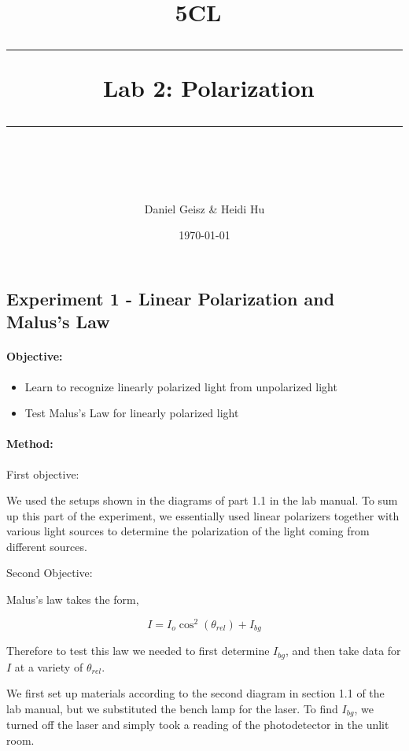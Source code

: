 \documentclass[11pt]{article}
\title{	
	\normalfont\normalsize
	\textsc{ 5CL}\ %
	\vspace{25pt} %
	\rule{\linewidth}{0.5pt}\ %
	\vspace{20pt} %
	{\huge Lab 2: Polarization}\ %
	\vspace{12pt} %
	\rule{\linewidth}{2pt}\ %
	\vspace{12pt} %
}
\author{\LARGE Daniel Geisz \& Heidi Hu} %
\date{\normalsize\today}
\providecommand{\tightlist}{%
      \setlength{\itemsep}{0pt}\setlength{\parskip}{0pt}}
\begin{document}
    
    
    \maketitle
    
    

    
    \hypertarget{experiment-1---linear-polarization-and-maluss-law}{%
\subsection{Experiment 1 - Linear Polarization and Malus's
Law}\label{experiment-1---linear-polarization-and-maluss-law}}

\hypertarget{objective}{%
\paragraph{Objective:}\label{objective}}

\begin{itemize}
\tightlist
\item
  Learn to recognize linearly polarized light from unpolarized light
\item
  Test Malus's Law for linearly polarized light
\end{itemize}

\hypertarget{method}{%
\paragraph{Method:}\label{method}}

First objective:

We used the setups shown in the diagrams of part 1.1 in the lab manual.
To sum up this part of the experiment, we essentially used linear
polarizers together with various light sources to determine the
polarization of the light coming from different sources.

Second Objective:

Malus's law takes the form,

\[I = I_o \cos^2(\theta_{rel}) + I_{bg}\]

Therefore to test this law we needed to first determine \(I_{bg}\), and
then take data for \(I\) at a variety of \(\theta_{rel}\).

We first set up materials according to the second diagram in section 1.1
of the lab manual, but we substituted the bench lamp for the laser. To
find \(I_{bg}\), we turned off the laser and simply took a reading of
the photodetector in the unlit room.
\end{document}
